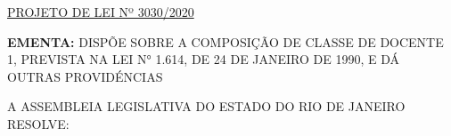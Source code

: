 \documentclass[10pt]{article}
\date{}
\begin{document}
\maketitle
\begin{center}
  \huge
  \vspace{-3cm}\href{http://alerjln1.alerj.rj.gov.br/scpro1923.nsf/f4b46b3cdbba990083256cc900746cf6/94de1155ed78b055032585cb005cf4ab?OpenDocument}{PROJETO DE LEI Nº 3030/2020}
\bigskip
\bigskip
\bigskip
  
\end{center}

\textbf{EMENTA:} 
DISPÕE SOBRE A COMPOSIÇÃO DE CLASSE DE DOCENTE 1, PREVISTA NA LEI N° 1.614, DE 24 DE JANEIRO DE 1990, E DÁ OUTRAS PROVIDÉNCIAS








\bigskip

\noindent
A ASSEMBLEIA LEGISLATIVA DO ESTADO DO RIO DE JANEIRO RESOLVE:
\end{document}
